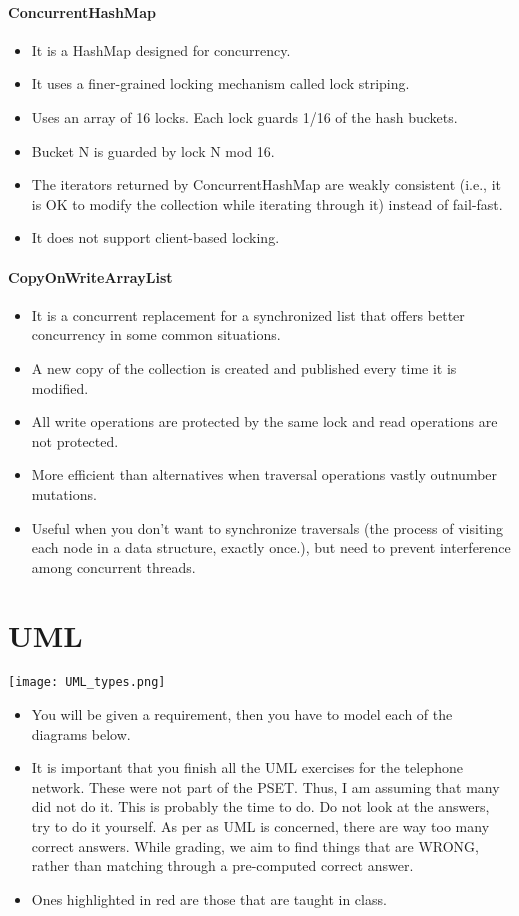 \documentclass[a4paper]{article}
\begin{document}
\paragraph{ConcurrentHashMap}
\begin{itemize}
	\item It is a HashMap designed for concurrency.
	\item It uses a finer-grained locking mechanism called lock striping.
	\item Uses an array of 16 locks. Each lock guards 1/16 of the hash buckets.
	\item Bucket N is guarded by lock N mod 16.
	\item The iterators returned by ConcurrentHashMap are weakly consistent (i.e., it is OK to modify the collection while iterating through it) instead of fail-fast.
	\item It does not support client-based locking.
\end{itemize}
\paragraph{CopyOnWriteArrayList}
\begin{itemize}
	\item It is a concurrent replacement for a synchronized list that offers better concurrency in some common situations.
	\item A new copy of the collection is created and published every time it is modified.
	\item All write operations are protected by the same lock and read operations are not protected. 
	\item More efficient than alternatives when traversal operations vastly outnumber mutations.
	\item Useful when you don’t want to synchronize traversals (the process of visiting each node in a data structure, exactly once.), but need to prevent interference among concurrent threads.
\end{itemize}
\section{UML}
\begin{center}
	\texttt{[image: UML\_types.png]}
\end{center}
\begin{displayquote}
	\begin{itemize}
		\item You will be given a requirement, then you have to model each of the diagrams below.
		\item It is important that you finish all the UML exercises for the telephone network. These were not part of the PSET. Thus, I am assuming that many did not do it. This is probably the time to do. Do not look at the answers, try to do it yourself. As per as UML is concerned, there are way too many correct answers. While grading, we aim to find things that are WRONG, rather than matching through a pre-computed correct answer.
		\item Ones highlighted in red are those that are taught in class.
	\end{itemize}
\end{displayquote}
\end{document}

